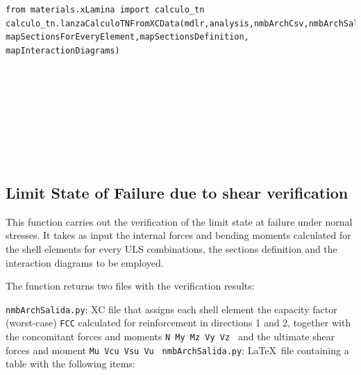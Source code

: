  
\begin{verbatim}
from materials.xLamina import calculo_tn
calculo_tn.lanzaCalculoTNFromXCData(mdlr,analysis,nmbArchCsv,nmbArchSalida, 
mapSectionsForEveryElement,mapSectionsDefinition, mapInteractionDiagrams)
\end{verbatim}
\begin{paramFuncTable}
\mdlr{} \\
\analysis{} \\
\\
\nmbArchSalida{}\\
\mapSectionsForEveryElement{} \\
\mapSectionsDefinition{} \\
\mapInteractionDiagrams{} \\
\end{paramFuncTable}


\subsection{Limit State of Failure due to shear verification}
This function carries out the verification of the limit state at failure under nornal stresses. It takes as input the internal forces and bending moments calculated for the shell elements for every ULS combinations, the sections definition and the interaction diagrams to be employed.

The function returns two files with the verification results:

{\tt nmbArchSalida.py}: XC file that assigns each shell element the capacity factor (worst-case) {\tt FCC} calculated for reinforcement in directions 1 and 2, together with the concomitant forces and moments {\tt N My Mz  Vy Vz } and the ultimate shear forces and moment {\tt Mu Vcu Vsu Vu }
{\tt nmbArchSalida.py}: \LaTeX\  file containing a table with the following items:


